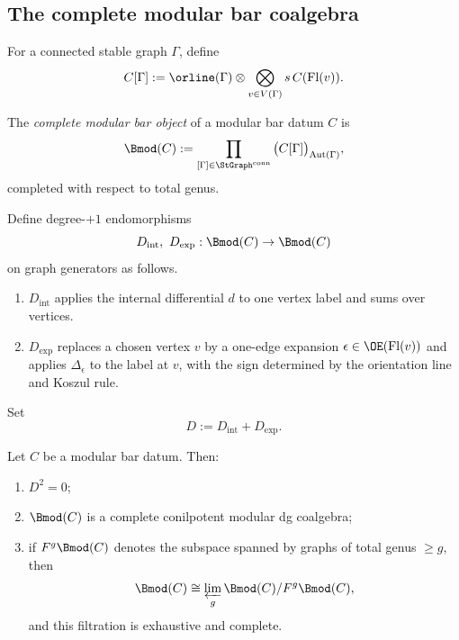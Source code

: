 \subsection{The complete modular bar coalgebra}
\label{sec:modular-bar-coalgebra}

For a connected stable graph $\Gamma$, define
\[
C[\Gamma]:=
\orline(\Gamma)\otimes\bigotimes_{v\in V(\Gamma)} s\,C(\mathrm{Fl}(v)).
\]

\begin{definition}
The \emph{complete modular bar object} of a modular bar datum $C$ is
\[
\Bmod(C):=
\prod_{[\Gamma]\in \StGraph^{\mathrm{conn}}}
\big(C[\Gamma]\big)_{\mathrm{Aut}(\Gamma)},
\]
completed with respect to total genus.
\end{definition}

\begin{definition}
Define degree-$+1$ endomorphisms
\[
D_{\mathrm{int}},\ D_{\mathrm{exp}}:\Bmod(C)\to \Bmod(C)
\]
on graph generators as follows.
\begin{enumerate}[leftmargin=2.4em]
\item $D_{\mathrm{int}}$ applies the internal differential $d$ to one vertex label and
sums over vertices.
\item $D_{\mathrm{exp}}$ replaces a chosen vertex $v$ by a one-edge expansion
$\epsilon\in \OE(\mathrm{Fl}(v))$ and applies $\Delta_\epsilon$ to the label at $v$,
with the sign determined by the orientation line and Koszul rule.
\end{enumerate}
Set
\[
D:=D_{\mathrm{int}}+D_{\mathrm{exp}}.
\]
\end{definition}

\begin{theorem}\label{thm:modular-bar}
Let $C$ be a modular bar datum. Then:
\begin{enumerate}[leftmargin=2.4em]
\item $D^2=0$;
\item $\Bmod(C)$ is a complete conilpotent modular dg coalgebra;
\item if $F^g\Bmod(C)$ denotes the subspace spanned by graphs of total genus $\ge g$, then
\[
\Bmod(C)\cong \varprojlim_g \Bmod(C)/F^g\Bmod(C),
\]
and this filtration is exhaustive and complete.
\end{enumerate}
\end{theorem}

